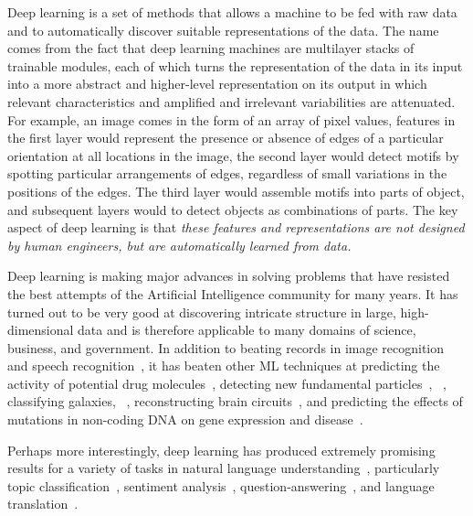 \documentclass[10pts]{article}
\begin{document}
Deep learning is a set of methods that allows a machine to be fed with
raw data and to automatically discover suitable representations of the
data. The name comes from the fact that deep learning machines are
multilayer stacks of trainable modules, each of which turns the
representation of the data in its input into a more abstract and
higher-level representation on its output in which relevant
characteristics and amplified and irrelevant variabilities are
attenuated. For example, an image comes in the form of an array of
pixel values, features in the first layer would represent the presence
or absence of edges of a particular orientation at all locations in
the image, the second layer would  detect motifs by spotting particular
arrangements of edges, regardless of small variations in the positions
of the edges.  The third layer would assemble motifs into parts of
object, and subsequent layers would to detect objects as combinations of
parts. The key aspect of deep learning is that {\em these features and
  representations are not designed by human engineers, but are
  automatically learned from data.}

Deep learning is making major advances in solving problems that have
resisted the best attempts of the Artificial Intelligence community
for many years. It has turned out to be very good at discovering
intricate structure in large, high-dimensional data and is therefore
applicable to many domains of science, business, and government. In
addition to beating records in image
recognition~\citep{Krizhevsky-2012-small,farabet-pami-13,tompson-nips-14,szegedy-2014}
and speech
recognition~\citep{Hinton-et-al-2012,Sainath-et-al-ICASSP2013}, it has
beaten other ML techniques at predicting the activity of potential
drug molecules~\citep{Dahl-et-al-arxiv2014}, detecting new fundamental
particles~\citep{Melis-Higgs-boson-competition-2014},
~\citep{YANNparticles}, classifying galaxies, ~\citep{YANNgalaxies},
reconstructing brain circuits~\citep{helmstaedter-nature-2013}, and
predicting the effects of mutations in non-coding DNA on gene
expression and disease~\citep{Keung-et-al-2014}.

Perhaps more interestingly, deep learning has produced extremely
promising results for a variety of tasks in natural language
understanding~\citep{collobert:2011b}, particularly topic
classification~\citep{topic-classification}, sentiment
analysis~\citep{Glorot+al-ICML-2011-small},
question-answering~\cite{bordes-14}, and language
translation~\cite{Sutskever-et-al-NIPS2014}.
\end{document}
